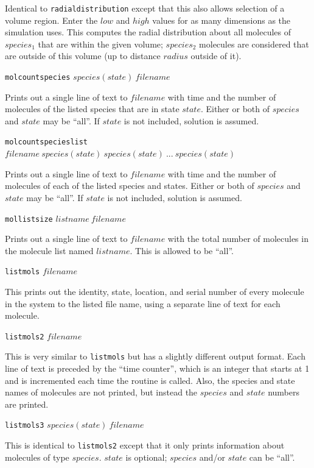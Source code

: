 \documentclass {scrbook}
\newcommand {\ttt} {\texttt}
\begin{document}
\begin{description}
Identical to \ttt{radialdistribution} except that this also allows selection of a volume region. Enter the $low$ and $high$ values for as many dimensions as the simulation uses. This computes the radial distribution about all molecules of $species_1$ that are within the given volume; $species_2$ molecules are considered that are outside of this volume (up to distance $radius$ outside of it).

\item{\ttt{molcountspecies} $species(state)\ filename$}

Prints out a single line of text to $filename$ with time and the number of molecules of the listed species that are in state $state$. Either or both of $species$ and $state$ may be ``all''. If $state$ is not included, solution is assumed.

\item{\ttt{molcountspecieslist} $filename\ species(state)\ species(state)\ ...\ species(state)$}

Prints out a single line of text to $filename$ with time and the number of molecules of each of the listed species and states. Either or both of $species$ and $state$ may be ``all''. If $state$ is not included, solution is assumed.

\item{\ttt{mollistsize} $listname\ filename$}

Prints out a single line of text to $filename$ with the total number of molecules in the molecule list named $listname$. This is allowed to be ``all''.

\item{\ttt{listmols} $filename$}

This prints out the identity, state, location, and serial number of every molecule in the system to the listed file name, using a separate line of text for each molecule.

\item{\ttt{listmols2} $filename$}

This is very similar to \ttt{listmols} but has a slightly different output format. Each line of text is preceded by the ``time counter'', which is an integer that starts at 1 and is incremented each time the routine is called. Also, the species and state names of molecules are not printed, but instead the $species$ and $state$ numbers are printed.

\item{\ttt{listmols3} $species(state)\ filename$}

This is identical to \ttt{listmols2} except that it only prints information about molecules of type $species$. $state$ is optional; $species$ and/or $state$ can be ``all''.


\end{description}
\end{document}
